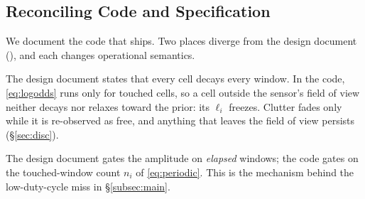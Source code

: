 \subsection{Reconciling Code and Specification}\label{subsec:specdiff}

We document the code that ships. Two places diverge from the design document (), and each changes operational semantics.

\begin{remark}\label{rem:fov}
The design document states that every cell decays every window. In the code, \eqref{eq:logodds} runs only for touched cells, so a cell outside the sensor's field of view neither decays nor relaxes toward the prior: its $\ell_i$ freezes. Clutter fades only while it is re-observed as free, and anything that leaves the field of view persists (\S\ref{sec:disc}).
\end{remark}
\begin{remark}
The design document gates the amplitude on \emph{elapsed} windows; the code gates on the touched-window count $n_i$ of \eqref{eq:periodic}. This is the mechanism behind the low-duty-cycle miss in \S\ref{subsec:main}.
\end{remark}
